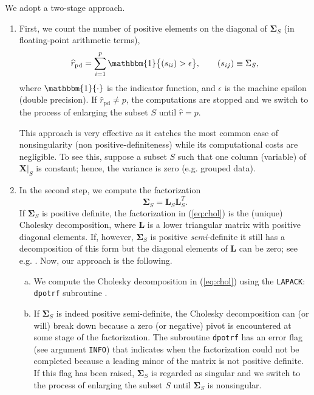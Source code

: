 \documentclass[a4paper,oneside,11pt,DIV=12]{scrartcl}
\newcommand{\code}[1]{{\texttt{#1}}}
\begin{document}
We adopt a two-stage approach.
\begin{enumerate}[(1)]
	\item First, we count the number of positive elements on the diagonal of $\bm \Sigma_S$ (in floating-point arithmetic terms),
	 \begin{equation}\label{eq:nonsingular1}
		\widehat{r}_{\mathrm{pd}} = \sum_{i=1}^p \mathbbm{1} \big\{ (s_{ii}) > \epsilon \big\}, \qquad (s_{ij}) \equiv \Sigma_S,
	 \end{equation}
	where $\mathbbm{1}\{ \cdot \}$ is the indicator function, and $\epsilon$ is the machine epsilon (double precision). If $\widehat{r}_{\mathrm{pd}} \neq p$, the computations are stopped and we switch to the process of enlarging the subset $S$ until $\widehat{r} = p$.

	This approach is very effective as it catches the most common case of nonsingularity (non positive-definiteness) while its computational costs are negligible. To see this, suppose a subset $S$ such that one column (variable) of $\bm X\vert_S$ is constant; hence, the variance is zero (e.g. grouped data).
	\item In the second step, we compute the factorization 
	\begin{equation}\label{eq:chol}
		\bm \Sigma_S = \bm L_S \bm L_S^T. 
	\end{equation}
	If $\bm \Sigma_S$ is positive definite, the factorization in (\ref{eq:chol}) is the (unique) Cholesky decomposition, where $\bm L$ is a lower triangular matrix with positive diagonal elements. If, however, $\bm \Sigma_S$ is positive \textit{semi}-definite it still has a decomposition of this form but the diagonal elements of $\bm L$ can be zero; see e.g. \citep[][Chap. 4.2.8]{golub_loan_1996}. Now, our approach is the following. 
	\begin{enumerate}[a)]
		\item  We compute the Cholesky decomposition in (\ref{eq:chol}) using the \code{LAPACK}: \code{dpotrf} subroutine \citep{anderson_bai_etal_1999}. 
		\item If $\bm \Sigma_S$ is indeed positive semi-definite, the Cholesky decomposition can (or will) break down because a zero (or negative) pivot is encountered at some stage of the factorization. The subroutine \code{dpotrf} has an error flag (see argument \code{INFO}) that indicates when the factorization could not be completed because a leading minor of the matrix is not positive definite. If this flag has been raised, $\bm \Sigma_S$ is regarded as singular and we switch to the process of enlarging the subset $S$ until $\bm \Sigma_S$ is nonsingular.    

\end{enumerate}
\end{enumerate}
\end{document}

